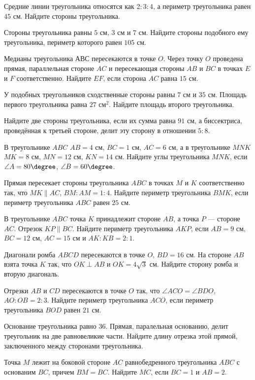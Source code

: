 \begin{class}[number=6]
	\begin{listofex}
		\item Средние линии треугольника относятся как \( 2 : 3 : 4 \), а периметр треугольника равен \( 45 \) см. Найдите стороны треугольника.
		\item Стороны треугольника равны \( 5 \) см, \( 3 \) см и \( 7 \) см. Найдите стороны подобного ему треугольника, периметр которого равен \( 105 \) см.
		\item Медианы треугольника АВС пересекаются в точке \( O \). Через точку \( O \) проведена прямая, параллельная стороне \( AC \) и пересекающая стороны \( AB \) и \( BC \) в точках \( E \) и \( F \) соответственно. Найдите \( EF \), если сторона \( AC \) равна \( 15 \) см.
		\item  У подобных треугольников сходственные стороны равны \( 7 \) см и \( 35 \) см. Площадь первого треугольника равна \( 27 \) см\( ^{2} \). Найдите площадь второго треугольника.
		\item  Найдите две стороны треугольника, если их сумма равна \( 91 \) см, а биссектриса, проведённая к третьей стороне, делит эту сторону в отношении \( 5:8 \).
		\item В треугольнике \( ABC \) \( AB = 4  \) см, \( BC = 1 \) см, \( AC = 6 \) см, а в треугольнике \( MNK \) \( MK = 8 \) см, \( MN = 12 \) см, \( KN = 14 \) см. Найдите углы треугольника \( MNK \), если \( \angle A = 80\degree \), \( \angle B = 60\degree \).
		\item Прямая пересекает стороны треугольника \( ABC \) в точках \( M \) и \( K \) соответственно так, что \( MK\parallel AC \), \( BM : AM = 1 : 4 \). Найдите периметр треугольника \( BMK \), если периметр треугольника \( ABC \) равен \( 25 \) см.
		\item В треугольнике  \( ABC \)  точка  \( K \)  принадлежит стороне  \( AB \),  а точка  \( P \) --- стороне  \( AC \). Отрезок  \( KP\parallel BC \).  Найдите периметр треугольника  \( AKP \), если  \( AB=9 \) см,  \( BC=12 \) см,  \( AC=15 \) см  и  \( AK : KB=2:1 \).
		\item Диагонали ромба \( ABCD \) пересекаются в точке \( O \), \( BD = 16 \) см. На стороне \( AB \) взята точка \( K \) так, что \( OK \perp AB \) и \( OK = 4\sqrt{3} \) см. Найдите сторону ромба и вторую диагональ.
		\item Отрезки \( AB \) и \( CD \) пересекаются в точке \( O \) так, что \( \angle ACO = \angle BDO \), \( AO : OB = 2:3 \). Найдите периметр треугольника \( ACO \), если периметр треугольника \( BOD  \) равен \( 21 \) см.
		\item Основание треугольника равно \( 36 \). Прямая, паралельная основанию, делит треугольник на две равновеликие части. Найдите длину отрезка этой прямой, заключенного между сторонами треугольника.
		\item Точка \( M \) лежит на боковой стороне \( AC \) равнобедренного треугольника \( ABC \) с основаним \( BC \), причем \( BM=BC \). Найдите \( MC \), если \( BC=1 \) и \( AB=2 \).
	\end{listofex}
\end{class}


